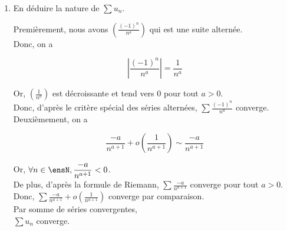 \begin{enumerate}
{        Donc, on a $\lambda = -a$.
    }

    \clearpage
    
    \item En déduire la nature de $\sum u_n$.

    \exobox
    {
        Premièrement, nous avons $\displaystyle (\frac{(-1)^n}{n^a})$ qui est une suite alternée. \\
        Donc, on a
        
        $$
            | \frac{(-1)^n}{n^a} | = \frac{1}{n^a}
        $$

        Or, $\displaystyle (\frac{1}{n^a})$ est décroissante et tend vers 0 pour tout $a > 0$. \\
        Donc, d'après le critère spécial des séries alternées, $\displaystyle \sum \frac{(-1)^n}{n^a}$ converge. \\

        Deuxièmement, on a

        $$
            \frac{- a}{n^{a + 1}} + o(\frac{1}{n^{a + 1}}) \sim \frac{- a}{n^{a + 1}}
        $$

        Or, $\displaystyle \forall n \in \ensN, \frac{- a}{n^{a + 1}} < 0$. \\
        De plus, d'après la formule de Riemann, $\displaystyle \sum \frac{- a}{n^{a + 1}}$ converge pour tout $a > 0$. \\
        Donc, $\displaystyle \sum \frac{- a}{n^{a + 1}} + o(\frac{1}{n^{a + 1}})$ converge par comparaison. \\

        Par somme de séries convergentes, \\
        $\sum u_n$ converge.
    }
\end{enumerate}